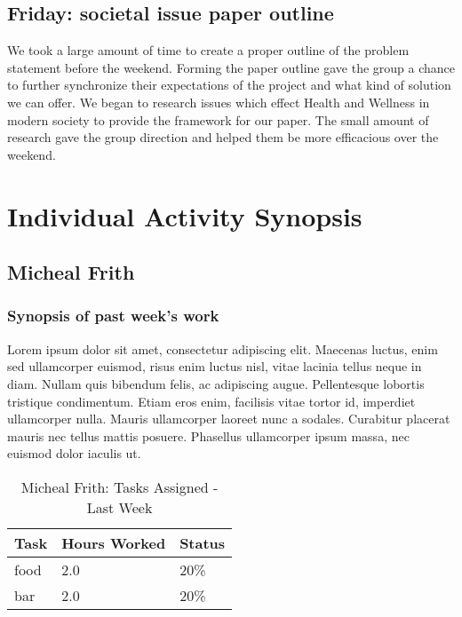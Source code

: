 \documentclass[12pt,article,compsoc]{IEEEtran}
\begin{document}
	\subsection{Friday: societal issue paper outline}
		We took a large amount of time to create a proper outline of the problem statement before the weekend. 
		Forming the paper outline gave the group a chance to further synchronize their expectations of the project 
		and what kind of solution we can offer. We began to research issues which effect Health and Wellness in 
		modern society to provide the framework for our paper. The small amount of research gave the group direction 
		and helped them be more efficacious over the weekend. 
		\clearpage


\section{Individual Activity Synopsis}
	\subsection{Micheal Frith}

	\subsubsection*{Synopsis of past week's work}

	Lorem ipsum dolor sit amet, consectetur adipiscing elit. Maecenas luctus, enim sed ullamcorper euismod, risus enim luctus nisl, vitae lacinia tellus neque in diam. Nullam quis bibendum felis, ac adipiscing augue. Pellentesque lobortis tristique condimentum. Etiam eros enim, facilisis vitae tortor id, imperdiet ullamcorper nulla. Mauris ullamcorper laoreet nunc a sodales. Curabitur placerat mauris nec tellus mattis posuere. Phasellus ullamcorper ipsum massa, nec euismod dolor iaculis ut.


	\begin{table}[ht]
	\renewcommand{\arraystretch}{1.3}
		\caption{Micheal Frith: Tasks Assigned - Last Week}
		
		\label{Summary of Micheal Frith's activities: this week}
		
		\centering
		\begin{tabular}{p{5.5cm}|p{1cm}|p{1cm}} 
		\hline
		\bfseries 	Task		 		& \bfseries Hours Worked	& \bfseries Status	\\
		\hline\hline	
					food					& 2.0						& 20\%				\\	%
					bar					& 2.0						& 20\%				\\	
		\hline
		\end{tabular}
	\end{table}
\end{document}
